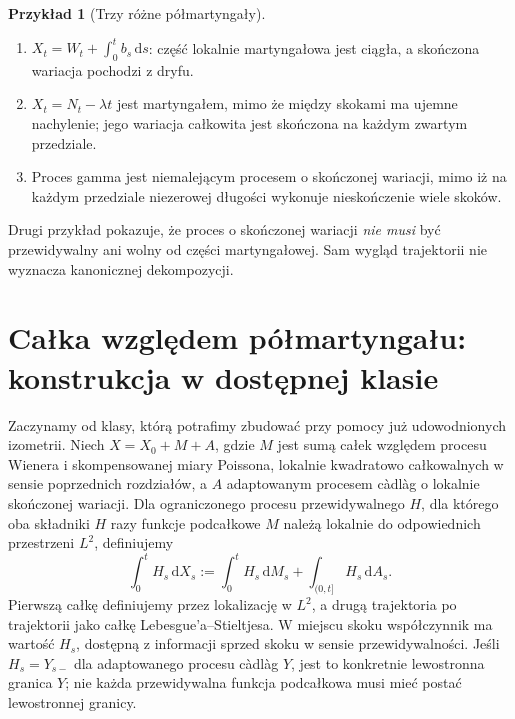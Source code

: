\documentclass[11pt,a4paper,oneside]{report}
\numberwithin{equation}{chapter}
\theoremstyle{plain}
\theoremstyle{definition}
\newtheorem{przyklad}{Przykład}[chapter]
\theoremstyle{remark}
\newcommand{\dd}{\mathrm{d}}
\begin{document}
\begin{przyklad}[Trzy różne półmartyngały]
\begin{enumerate}
\item $X_t=W_t+\int_0^tb_s\,\dd s$: część
lokalnie martyngałowa jest ciągła, a skończona wariacja
pochodzi z dryfu.
\item $X_t=N_t-\lambda t$ jest martyngałem, mimo że
między skokami ma ujemne nachylenie; jego wariacja
całkowita jest skończona na każdym zwartym przedziale.
\item Proces gamma jest niemalejącym procesem o
skończonej wariacji, mimo iż na każdym przedziale
niezerowej długości wykonuje nieskończenie wiele skoków.
\end{enumerate}
Drugi przykład pokazuje, że proces o skończonej wariacji
\emph{nie musi} być przewidywalny ani wolny od części
martyngałowej. Sam wygląd trajektorii nie wyznacza
kanonicznej dekompozycji.
\end{przyklad}

\section{Całka względem półmartyngału: konstrukcja w dostępnej klasie}\label{sec:volIII:12:02}

Zaczynamy od klasy, którą potrafimy zbudować przy pomocy
już udowodnionych izometrii. Niech $X=X_0+M+A$, gdzie
$M$ jest sumą całek względem procesu Wienera i
skompensowanej miary Poissona, lokalnie kwadratowo
całkowalnych w sensie poprzednich rozdziałów, a $A$
adaptowanym procesem càdlàg o lokalnie skończonej wariacji.
Dla ograniczonego procesu przewidywalnego $H$, dla którego
oba składniki $H$ razy funkcje podcałkowe $M$ należą lokalnie
do odpowiednich przestrzeni $L^2$, definiujemy
\[
\int_0^t H_s\,\dd X_s
:=\int_0^tH_s\,\dd M_s+\int_{(0,t]}H_s\,\dd A_s.
\tag{12.1}\label{eq:semi-integral}
\]
Pierwszą całkę definiujemy przez lokalizację w $L^2$,
a drugą trajektoria po trajektorii jako całkę Lebesgue'a--Stieltjesa.
W miejscu skoku współczynnik ma wartość $H_s$, dostępną
z informacji sprzed skoku w sensie przewidywalności. Jeśli
$H_s=Y_{s-}$ dla adaptowanego procesu càdlàg $Y$, jest to
konkretnie lewostronna granica $Y$; nie każda przewidywalna
funkcja podcałkowa musi mieć postać lewostronnej granicy.
\end{document}
